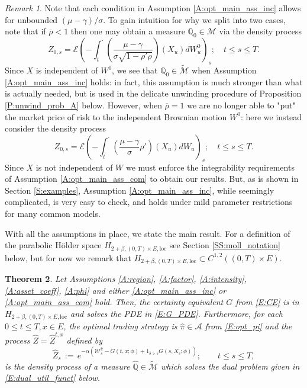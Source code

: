 \documentclass[11pt, letterpaper]{amsart}
\newtheorem{theorem}{Theorem}[section]
\theoremstyle{definition}
\theoremstyle{remark}
\newtheorem{remark}[theorem]{Remark}
\numberwithin{equation}{section}
\newcommand{\We}{\mathcal{W}}
\newcommand{\hpi}{\hat{\pi}}
\newcommand{\qprob}{\mathbb{Q}}
\newcommand{\M}{\mathcal{M}}
\newcommand{\tM}{\widetilde{\mathcal{M}}}
\newcommand{\EN}{\mathcal{E}}
\newcommand{\dfn}{\, := \,}
\newcommand{\ol}[1]{\overline{#1}}
\begin{document}
\begin{remark} Note that each condition in Assumption \ref{A:opt_main_ass_inc} allows for unbounded $(\mu-\gamma)/\sigma$. To gain intuition for why we split into two cases, note that if $\ol{\rho} < 1$ then one may obtain a measure $\qprob_0\in\M$ via the density process
\begin{equation*}
Z_{0,s} = \EN\left(-\int_t^\cdot \left(\frac{\mu-\gamma}{\sigma\sqrt{1-\rho'\rho}}\right)(X_u)dW^0_u\right)_s;\quad t\leq s\leq T.
\end{equation*}
Since $X$ is independent of $W^0$, we see that $\qprob_0\in\tM$ when Assumption \ref{A:opt_main_ass_inc} holds: in fact, this assumption is much stronger than what is actually needed, but is used in the delicate unwinding procedure of Proposition \ref{P:unwind_prob_A} below.  However, when $\ol{\rho} =1$ we are no longer able to "put" the market price of risk to the independent Brownian motion $W^0$: here we instead consider the density process
\begin{equation*}
Z_{0,s} = \EN\left(-\int_t^\cdot \left(\frac{\mu-\gamma}{\sigma}\rho'\right)(X_u)dW_u\right)_s;\quad t\leq s\leq T.
\end{equation*}
Since $X$ is not independent of $W$ we must enforce the integrability requirements of Assumption \ref{A:opt_main_ass_com} to obtain our results.  But, as is shown in Section \ref{S:examples}, Assumption \ref{A:opt_main_ass_inc}, while seemingly complicated, is very easy to check, and holds under mild parameter restrictions for many common models.
\end{remark}

With all the assumptions in place, we state the main result. For a definition of the parabolic H\"{o}lder space $H_{2+\beta,(0,T)\times E,\textrm{loc}}$ see Section \ref{SS:moll_notation} below, but for now we remark that $H_{2+\beta,(0,T)\times E,\textrm{loc}}\subset C^{1,2}((0,T)\times E)$.

\begin{theorem}\label{T:main_result}
Let Assumptions \ref{A:region}, \ref{A:factor}, \ref{A:intensity}, \ref{A:asset_coeff}, \ref{A:phi} and either \ref{A:opt_main_ass_inc} or \ref{A:opt_main_ass_com} hold.  Then, the certainty equivalent $G$ from \eqref{E:CE} is in $H_{2+\beta,(0,T)\times E, \textrm{loc}}$ and solves the PDE in \eqref{E:G_PDE}.  Furthermore, for each $0\leq t\leq T, x\in E$, the optimal trading strategy is $\hpi\in\mathcal{A}$ from \eqref{E:opt_pi} and the process $\hat{Z} = \hat{Z}^{t,x}$ defined by
\begin{equation}\label{E:hat_Z}
\hat{Z}_s \dfn e^{-\alpha\left(\We^{\hpi}_s - G(t,x;\phi) + 1_{\delta > s}G(s,X_s;\phi)\right)};\qquad t\leq s\leq T,
\end{equation}
is the density process of a measure $\hat{\qprob}\in \tM$ which solves the dual problem given in \eqref{E:dual_util_funct} below.
\end{theorem}
\end{document}

